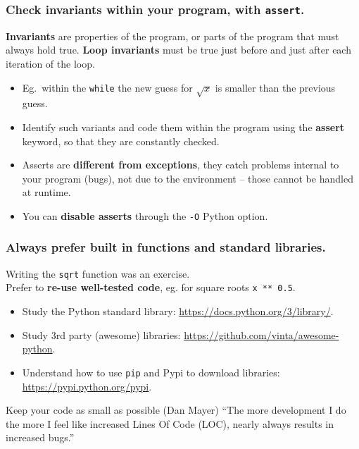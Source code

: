 \documentclass{beamer} %
\newcommand\emc[1]{\textcolor{brightblue}{\textbf{#1}}}
\begin{document}
\begin{frame}
\frametitle{Check invariants within your program, with \texttt{assert}.}

\begin{definition}\emc{Invariants} are properties of the program, or parts of the program that must always hold true. \emc{Loop invariants} must be true just before and just after each iteration of the loop.
\end{definition}

\begin{itemize}
	\item Eg.\ within the \texttt{while} the new guess for $\sqrt{x}$ is smaller than the previous guess.
	\item Identify such variants and code them within the program using the \emc{assert} keyword, so that they are constantly checked.
	\item Asserts are \emc{different from exceptions}, they catch problems internal to your program (bugs), not due to the environment -- those cannot be handled at runtime.
	\item You can \emc{disable asserts} through the \texttt{-O} Python option.
\end{itemize}

\end{frame}



\begin{frame}
\frametitle{Always prefer built in functions and standard libraries.}

Writing the \texttt{sqrt} function was an exercise. \\ Prefer to \emc{re-use well-tested code}, eg.  for square roots \texttt{x ** 0.5}.
\begin{itemize}
	\item Study the Python standard library: \url{https://docs.python.org/3/library/}.
	\item Study 3rd party (awesome) libraries: \url{https://github.com/vinta/awesome-python}.
	\item Understand how to use \texttt{pip} and Pypi to download libraries: 
	\url{https://pypi.python.org/pypi}.
\end{itemize}

\begin{block}{Keep your code as small as possible (Dan Mayer)}
``The more development I do the more I feel like increased Lines Of Code (LOC), nearly always results in increased bugs.''
\end{block}

\end{frame}
\end{document}
